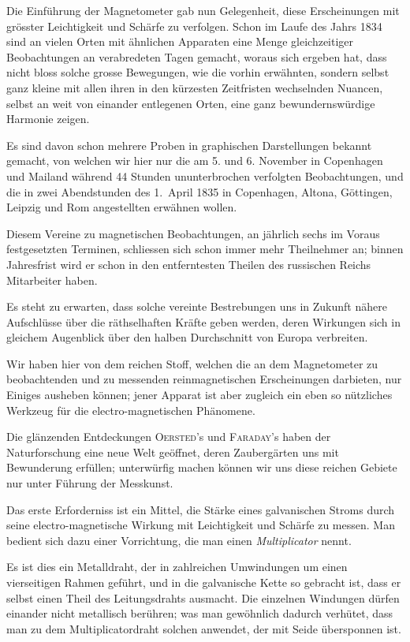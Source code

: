 \documentclass[12pt,a4paper]{article}
\begin{document}
Die Einführung der Magnetometer gab nun Gelegenheit, diese Erscheinungen mit grösster Leichtigkeit und Schärfe zu verfolgen. Schon im Laufe des Jahrs 1834 sind an vielen Orten mit ähnlichen Apparaten eine Menge gleichzeitiger Beobachtungen an verabredeten Tagen gemacht, woraus sich ergeben hat, dass nicht bloss solche grosse Bewegungen, wie die vorhin erwähnten, sondern selbst ganz kleine mit allen ihren in den kürzesten Zeitfristen wechselnden Nuancen, selbst an weit von einander entlegenen Orten, eine ganz bewundernswürdige Harmonie zeigen.

Es sind davon schon mehrere Proben in graphischen Darstellungen bekannt gemacht, von welchen wir hier nur die am 5. und 6. November in Copenhagen und Mailand während 44 Stunden ununterbrochen verfolgten Beobachtungen, und die in zwei Abendstunden des 1.~April 1835 in Copenhagen, Altona, Göttingen, Leipzig und Rom angestellten erwähnen wollen.

Diesem Vereine zu magnetischen Beobachtungen, an jährlich sechs im Voraus festgesetzten Terminen, schliessen sich schon immer mehr Theilnehmer an; binnen Jahresfrist wird er schon in den entferntesten Theilen des russischen Reichs Mitarbeiter haben.

Es steht zu erwarten, dass solche vereinte Bestrebungen uns in Zukunft nähere Aufschlüsse über die räthselhaften Kräfte geben werden, deren Wirkungen sich in gleichem Augenblick über den halben Durchschnitt von Europa verbreiten.

\bigskip

Wir haben hier von dem reichen Stoff, welchen die an dem Magnetometer zu beobachtenden und zu messenden reinmagnetischen Erscheinungen darbieten, nur Einiges ausheben können; jener Apparat ist aber zugleich ein eben so nützliches Werkzeug für die electro-magnetischen Phänomene.

Die glänzenden Entdeckungen \textsc{Oersted}'s und \textsc{Faraday}'s haben der Naturforschung eine neue Welt geöffnet, deren Zaubergärten uns mit Bewunderung erfüllen; unterwürfig machen können wir uns diese reichen Gebiete nur unter Führung der Messkunst.

Das erste Erforderniss ist ein Mittel, die Stärke eines galvanischen Stroms durch seine electro-magnetische Wirkung mit Leichtigkeit und Schärfe zu messen. Man bedient sich dazu einer Vorrichtung, die man einen \textit{Multiplicator} nennt.

Es ist dies ein Metalldraht, der in zahlreichen Umwindungen um einen vierseitigen Rahmen geführt, und in die galvanische Kette so gebracht ist, dass er selbst einen Theil des Leitungsdrahts ausmacht. Die einzelnen Windungen dürfen einander nicht metallisch berühren; was man gewöhnlich dadurch verhütet, dass man zu dem Multiplicatordraht solchen anwendet, der mit Seide übersponnen ist.
\end{document}
